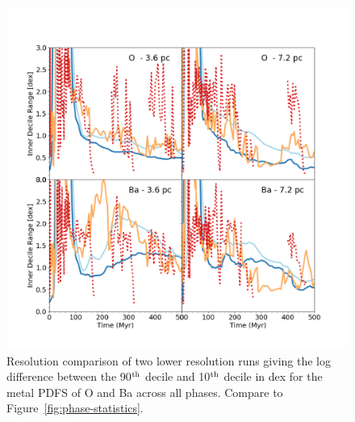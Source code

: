 \begin{figure}
\centering
\includegraphics[width=0.95\linewidth]{figures/ch3/O_Ba_resolution_study}
\caption{Resolution comparison of two lower resolution runs giving the log difference between the 90$^{\rm th}$ decile and 10$^{\rm th}$ decile in dex for the metal PDFS of O and Ba across all phases. Compare to Figure~\ref{fig:phase-statistics}.}
\label{fig:resolution-phase}
\end{figure}


\renewcommand\thesection{\thechapter.\arabic{section}}
